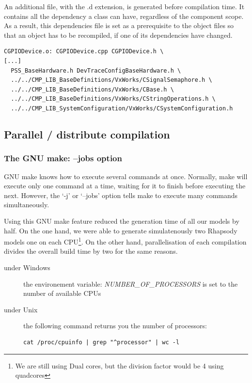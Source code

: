 \documentclass[dvips]{imsart}
\begin{document}
An additional file, with the .d extension, is generated before compilation
time. It contains all the dependency a class can have, regardless of the
component scope. As a result, this dependencies file is set as a prerequisite to
the object files so that an object has to be recompiled, if one of its dependencies have
changed.

\lstset{frame=shadowbox, numbers=left, breaklines=true,
caption=snippet of CGPIODevice.d}
\begin{lstlisting}
CGPIODevice.o: CGPIODevice.cpp CGPIODevice.h \
[...]
  PSS_BaseHardware.h DevTraceConfigBaseHardware.h \
  ../../CMP_LIB_BaseDefinitions/VxWorks/CSignalSemaphore.h \
  ../../CMP_LIB_BaseDefinitions/VxWorks/CBase.h \
  ../../CMP_LIB_BaseDefinitions/VxWorks/CStringOperations.h \
  ../../CMP_LIB_SystemConfiguration/VxWorks/CSystemConfiguration.h
\end{lstlisting}

\subsection{Parallel / distribute compilation}
\subsubsection{The GNU make: --jobs option}
GNU make knows how to execute several commands at once.
Normally, make will execute only one command at a time, waiting for it to finish before executing the next.
However, the `-j' or `--jobs' option tells make to execute many commands
simultaneously\cite{GNUmake-06}.

Using this GNU make feature reduced the generation time of all our models by
half. On the one hand, we were able to generate simulatenously two Rhapsody
models one on each CPU\footnote{We are still using Dual cores, but the division factor
would be 4 using quadcores}. On the other hand, parallelisation of each
compilation divides the overall build time by two for the same reasons.

\begin{description}
\item[under Windows] the environement variable: \emph{NUMBER\_OF\_PROCESSORS} is
set to the number of available CPUs
\item[under Unix] the following command returns you the number of processors:
\begin{verbatim}
cat /proc/cpuinfo | grep "^processor" | wc -l
\end{verbatim}
\end{description}
\end{document}
